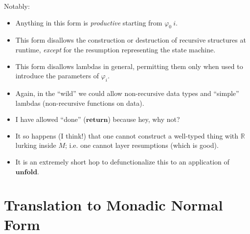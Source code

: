 \documentclass{article}[11pt]
\begin{document}
Notably:
\begin{itemize}
\item Anything in this form is {\em productive} starting from $\varphi_0~ i$.
\item This form disallows the construction or destruction of recursive structures at runtime, {\em except} for the resumption representing the state machine.
\item This form disallows lambdas in general, permitting them only when used to introduce the parameters of $\varphi_i$.
\item Again, in the ``wild'' we could allow non-recursive data types and ``simple'' lambdas (non-recursive functions on data).
\item I have allowed ``done'' ($\mathbf{return}$) because hey, why not?
\item It so happens (I think!) that one cannot construct a well-typed thing with $\mathbb{R}$ lurking inside $M$; i.e. one cannot layer resumptions (which is good).
\item It is an extremely short hop to defunctionalize this to an application of $\mathbf{unfold}$.
\end{itemize}

\section{Translation to Monadic Normal Form}
\end{document}
